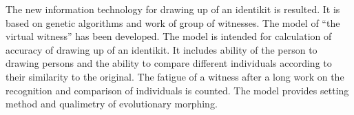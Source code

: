 \titele{\tit}{\aut}{\auf}{\leftkol}{\rightkol}

 \label{end\stat}

\noindent
The new information technology for drawing up of an identikit is resulted. 
It is based on genetic algorithms and work of group of witnesses. The model of ``the virtual witness'' 
has been developed. The model is intended for calculation of accuracy of drawing up of an identikit. 
It includes ability of the person to drawing persons and the ability to compare different individuals 
according to their similarity to the original. The fatigue of a witness after a long work on the 
recognition and comparison of individuals is counted. The model provides setting method and qualimetry 
of evolutionary morphing.


